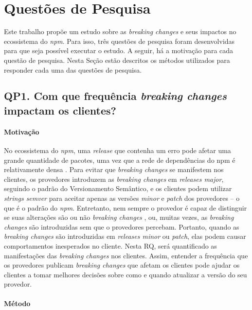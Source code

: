 \chapter{Questões de Pesquisa}
\label{cap:qp}

Este trabalho propõe um estudo sobre as \textit{breaking changes} e seus impactos no ecossistema do \textit{npm}. Para isso, três questões de pesquisa foram desenvolvidas para que seja possível executar o estudo. A seguir, há a motivação para cada questão de pesquisa. Nesta Seção estão descritos os métodos utilizados para responder cada uma das questões de pesquisa.

\section{QP1. Com que frequência \textit{breaking changes} impactam os clientes?}
\label{sec:qp1}

\subsubsection{Motivação}
\label{sec:qp1:motivation}
No ecossistema do \textit{npm}, uma \textit{release} que contenha um erro pode afetar uma grande quantidade de pacotes, uma vez que a rede de dependências do npm é relativamente densa \cite{teorical_reference:npm_2}. Para evitar que \textit{breaking changes} se manifestem nos clientes, os provedores introduzem as \textit{breaking changes} em \textit{releases major}, seguindo o padrão do Versionamento Semântico, e os clientes podem utilizar \textit{strings semver} para aceitar apenas as versões \textit{minor} e \textit{patch} dos provedores -- o que é o padrão do \textit{npm}. Entretanto, nem sempre o provedor é capaz de distinguir se suas alterações são ou não \textit{breaking changes} \cite{noregrets2018}, ou, muitas vezes, as \textit{breaking changes} são introduzidas sem que o provedores percebam. Portanto, quando as \textit{breaking changes} são introduzidas em \textit{releases minor} ou \textit{patch}, elas podem causar comportamentos inesperados no cliente. Nesta RQ, será quantificado as manifestações das \textit{breaking changes} nos clientes. Assim, entender a frequência que os provedores publicam \textit{breaking changes} que afetam os clientes pode ajudar os clientes a tomar melhores decisões sobre como e quando atualizar a versão do seu provedor.

\subsubsection{Método}
\label{sec:qp1:approach}

